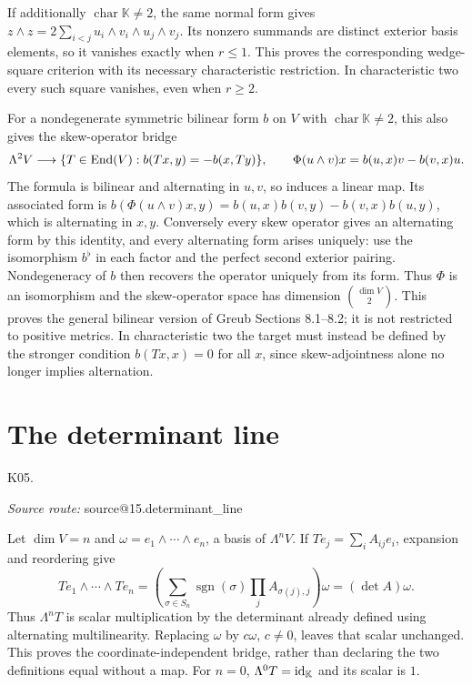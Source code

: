 \documentclass[11pt,a4paper]{book}
\makeatletter
\theoremstyle{definition}\newtheorem{definition}[theorem]{Definition}
\theoremstyle{remark}\newtheorem{remark}[theorem]{Remark}
\newcommand{\K}{\mathbb K}\newcommand{\R}{\mathbb R}\newcommand{\C}{\mathbb C}
\newcommand{\Kentry}[2]{\section{#2}\label{k:#1}\noindent\textsf{\small K05.\detokenize{#1}}\par
  \begingroup\small\color{black!65}\textit{Source route: }\csname source@#1\endcsname\par\endgroup}
\makeatother
\begin{document}
If additionally $\operatorname{char}\K\ne2$, the same normal form gives
$z\wedge z=2\sum_{i<j}u_i\wedge v_i\wedge u_j\wedge v_j$.
Its nonzero summands are distinct exterior basis elements, so it vanishes exactly when $r\le1$. This proves the corresponding wedge-square criterion with its necessary characteristic restriction. In characteristic two every such square vanishes, even when $r\ge2$.


For a nondegenerate symmetric bilinear form $b$ on $V$ with $\operatorname{char}\K\ne2$, this also gives the skew-operator bridge
\[
 \Lambda^2V\longrightarrow\{T\in\operatorname{End}(V):b(Tx,y)=-b(x,Ty)\},\qquad
 \Phi(u\wedge v)x=b(u,x)v-b(v,x)u.
\]
The formula is bilinear and alternating in $u,v$, so induces a linear map. Its associated form is
$b(\Phi(u\wedge v)x,y)=b(u,x)b(v,y)-b(v,x)b(u,y)$,
which is alternating in $x,y$. Conversely every skew operator gives an alternating form by this identity, and every alternating form arises uniquely: use the isomorphism $b^\flat$ in each factor and the perfect second exterior pairing. Nondegeneracy of $b$ then recovers the operator uniquely from its form. Thus $\Phi$ is an isomorphism and the skew-operator space has dimension $\binom{\dim V}{2}$. This proves the general bilinear version of Greub Sections 8.1--8.2; it is not restricted to positive metrics. In characteristic two the target must instead be defined by the stronger condition $b(Tx,x)=0$ for all $x$, since skew-adjointness alone no longer implies alternation.

\Kentry{15.determinant_line}{The determinant line}
Let $\dim V=n$ and $\omega=e_1\wedge\cdots\wedge e_n$, a basis of $\Lambda^nV$. If $Te_j=\sum_iA_{ij}e_i$, expansion and reordering give
\[
 Te_1\wedge\cdots\wedge Te_n
 =\left(\sum_{\sigma\in S_n}\operatorname{sgn}(\sigma)\prod_jA_{\sigma(j),j}\right)\omega
 =(\det A)\omega.
\]
Thus $\Lambda^nT$ is scalar multiplication by the determinant already defined using alternating multilinearity. Replacing $\omega$ by $c\omega$, $c\ne0$, leaves that scalar unchanged. This proves the coordinate-independent bridge, rather than declaring the two definitions equal without a map. For $n=0$, $\Lambda^0T=\id_\K$ and its scalar is $1$.
\end{document}
